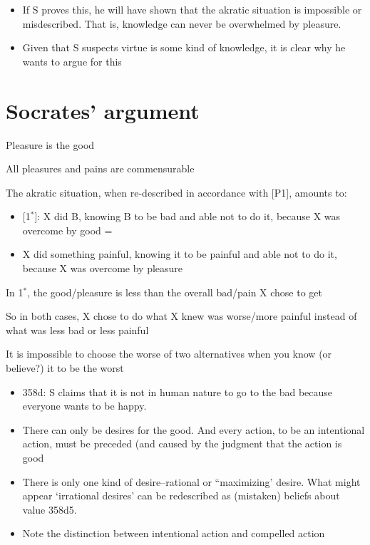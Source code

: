\documentclass[oneside]{article}
\begin{document}
\begin{itemize}\item{If S proves this, he will have shown that the akratic situation is impossible or misdescribed. That is, knowledge can never be overwhelmed by pleasure. }



\item{Given that S suspects virtue is some kind of knowledge, it is clear why he wants to argue for this}\end{itemize}

\section*{Socrates' argument}

\noindent [P1] Pleasure is the good
\vspace*{2mm}

\noindent [P2] All pleasures and pains are commensurable
\vspace*{2mm}

\noindent [P3] The akratic situation, when re-described in accordance with [P1], amounts to:

\begin{itemize}
\item{[1$^{*}$]: X did B, knowing B to be bad and able not to do it, because X was overcome by good =}
\item{X did something painful, knowing it to be painful and able not to do it, because X was overcome by pleasure}\end{itemize}
\vspace*{2mm}
 
 \noindent [P4] In 1$^{*}$, the good/pleasure is less than the overall bad/pain X chose to get
 \vspace*{2mm}
 
 \noindent [P5] So in both cases, X chose to do what X knew was worse/more painful instead of what was less bad or less painful
 \vspace*{2mm}
 
 \noindent [P6] It is impossible to choose the worse of two alternatives when you know (or believe?) it to be the worst
 
 \vspace*{2mm}
 \begin{itemize}
 \item  358d: S claims that it is not in human nature to go to the bad because everyone wants to be happy.
 \item There can only be desires for the good. And every action, to be an intentional action, must be preceded (and caused by the judgment that the action is good
 \item There is only one kind of desire--rational or ``maximizing' desire. What might appear `irrational desires' can be redescribed as (mistaken) beliefs about value 358d5. 
 \item Note the distinction between intentional action and compelled action
 \end{itemize}
\end{document}
